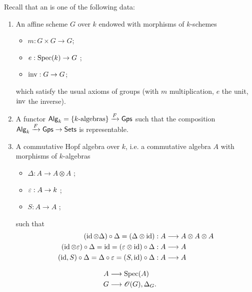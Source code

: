 Recall that an  is one of the following data:
\begin{enumerate}[(1)]
	\item An affine scheme $G$ over $k$ endowed with morphisms of $k$-schemes
		\begin{itemize}
			\item $m:G\times G\to G$; 
			\item $e:\Spec(k)\to G$ ;
			\item $\i:G\to G$;
		\end{itemize}
		which satisfy the usual axioms of groups (with $m$ multiplication, $e$ the unit, $\operatorname{inv}$ the inverse).
	\item A functor $\mathsf{Alg}_k = \{k\text{-algebras}\} \xrightarrow{F} \mathsf{Gps}$ such that the composition $\Alg_k \xrightarrow{F}\Grp\to \Set$ is representable.
	\item A commutative Hopf algebra over $k$, i.e. a commutative algebra $A$ with morphisms of $k$-algebras
		\begin{itemize}
			\item $\Delta:A \to A\otimes A$ ;
			\item $\eps:A\to k$ ;
			\item $S:A\to A$ ;
		\end{itemize}
		such that
		\begin{align*}
			(\id \otimes\Delta) \circ \Delta = (\Delta \otimes \id) &: A \to A\otimes A \otimes A \\
			(\id\otimes \eps) \circ \Delta = \id = (\eps\otimes\id)\circ\Delta &: A \to A \\
			(\id,S)\circ \Delta = \Delta \circ \eps = (S,\id)\circ\Delta &:A \to A
		\end{align*}
\end{enumerate}
\begin{notation}
\begin{align*}
	A &\to \Spec(A) \\
	G &\to \OO(G), \Delta_G.
\end{align*}
\end{notation}
